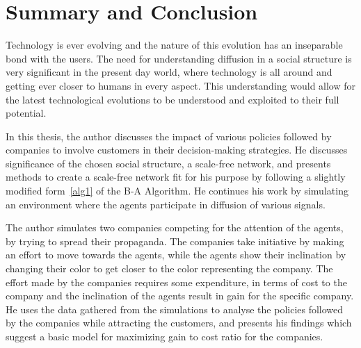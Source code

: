 
\chapter{Summary and Conclusion} %

\label{Chapter7} %



Technology is ever evolving and the nature of this evolution has an inseparable bond with the users. The need for understanding diffusion in a social structure is very significant in the present day world, where technology is all around and getting ever closer to humans in every aspect. This understanding would allow for the latest technological evolutions to be understood and exploited to their full potential.

In this thesis, the author discusses the impact of various policies followed by companies to involve customers in their decision-making strategies. He discusses significance of the chosen social structure, a scale-free network, and presents methods to create a scale-free network fit for his purpose by following a slightly modified form~\ref{alg1} of the B-A Algorithm. He continues his work by simulating an environment where the agents participate in diffusion of various signals.

The author simulates two companies competing for the attention of the agents, by trying to spread their propaganda. The companies take initiative by making an effort to move towards the agents, while the agents show their inclination by changing their color to get closer to the color representing the company. The effort made by the companies requires some expenditure, in terms of cost to the company and the inclination of the agents result in gain for the specific company. He uses the data gathered from the simulations to analyse the policies followed by the companies while attracting the customers, and presents his findings which suggest a basic model for maximizing gain to cost ratio for the companies.


